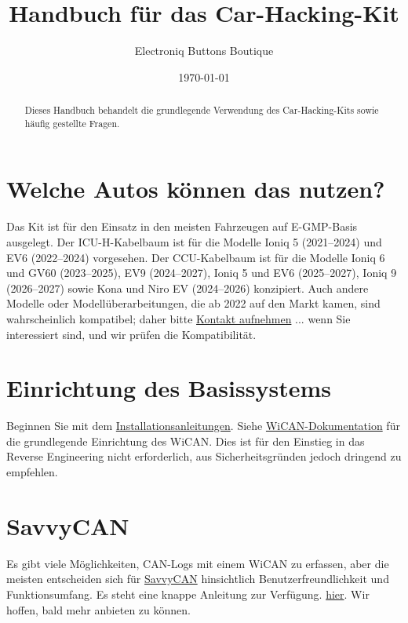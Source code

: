 \documentclass[superscriptaddress,onecolumn,floatfix]{revtex4-2}
\makeatletter
\DeclareRobustCommand{\selectlanguage}[1]{%
    \@ifundefined{alias@\string#1}
      {\ORIGselectlanguage{#1}}
      {\begingroup\edef\x{\endgroup
         \noexpand\ORIGselectlanguage{\@nameuse{alias@#1}}}\x}%
}
\makeatother
\begin{document}
\selectlanguage{de}

\begin{abstract}
  Dieses Handbuch behandelt die grundlegende Verwendung des Car-Hacking-Kits sowie häufig gestellte Fragen.
\end{abstract}
\title{Handbuch für das Car-Hacking-Kit}
\author{Electroniq Buttons Boutique}
\date{\today}

\maketitle


\section{Welche Autos können das nutzen?} \label{sect:eligibility}
Das Kit ist für den Einsatz in den meisten Fahrzeugen auf E-GMP-Basis ausgelegt. Der ICU-H-Kabelbaum ist für die Modelle Ioniq 5 (2021–2024) und EV6 (2022–2024) vorgesehen. Der CCU-Kabelbaum ist für die Modelle Ioniq 6 und GV60 (2023–2025), EV9 (2024–2027), Ioniq 5 und EV6 (2025–2027), Ioniq 9 (2026–2027) sowie Kona und Niro EV (2024–2026) konzipiert. Auch andere Modelle oder Modellüberarbeitungen, die ab 2022 auf den Markt kamen, sind wahrscheinlich kompatibel; daher bitte \href{mailto:requests@electroniqbuttons.com}{Kontakt aufnehmen} ... wenn Sie interessiert sind, und wir prüfen die Kompatibilität. 

\section{Einrichtung des Basissystems}
Beginnen Sie mit dem \href{https://github.com/tylerharvey/Ioniq5_CAN/blob/main/guides/}{Installationsanleitungen}. Siehe \href{https://meatpihq.github.io/wican-fw/config/wifi}{WiCAN-Dokumentation} für die grundlegende Einrichtung des WiCAN. Dies ist für den Einstieg in das Reverse Engineering nicht erforderlich, aus Sicherheitsgründen jedoch dringend zu empfehlen.

\section{SavvyCAN}
Es gibt viele Möglichkeiten, CAN-Logs mit einem WiCAN zu erfassen, aber die meisten entscheiden sich für \href{https://www.savvycan.com/}{SavvyCAN} hinsichtlich Benutzerfreundlichkeit und Funktionsumfang. Es steht eine knappe Anleitung zur Verfügung. \href{https://meatpihq.github.io/wican-fw/savvycan/usage}{hier}. Wir hoffen, bald mehr anbieten zu können.
\end{document}
